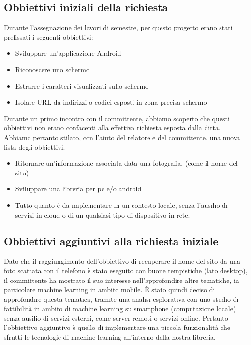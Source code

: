 \documentclass[twoside]{supsistudent}
\newcommand{\Decaa}{\newline\vspace{0.5mm}\newline\noindent}
\begin{document}
\subsection{Obbiettivi iniziali della richiesta}
Durante l’assegnazione dei lavori di semestre, per questo progetto erano stati prefissati i seguenti obbiettivi:

\begin{itemize}
\item Sviluppare un'applicazione Android
\item Riconoscere uno schermo
\item Estrarre i caratteri visualizzati sullo schermo
\item Isolare URL da indirizzi o codici esposti in zona precisa schermo

\end{itemize}

Durante un primo incontro con il committente, abbiamo scoperto che questi obbiettivi non erano confacenti alla effettiva richiesta esposta dalla ditta. Abbiamo pertanto stilato, con l’aiuto del relatore e del committente, una nuova lista degli obbiettivi.

\begin{itemize}
\item Ritornare un'informazione associata data una fotografia, (come il nome del sito)
\item Sviluppare una libreria per pc e/o android
\item Tutto quanto è da implementare in un contesto locale, senza l'ausilio di servizi in cloud o di un qualsiasi tipo di dispositivo in rete.
\end{itemize}

\subsection{Obbiettivi aggiuntivi alla richiesta iniziale}
Dato che il raggiungimento dell'obbiettivo di recuperare il nome del sito da una foto scattata con il telefono è stato eseguito con buone tempistiche (lato desktop), il committente ha mostrato il suo interesse nell'approfondire altre tematiche, in particolare machine learning in ambito mobile.
\Decaa
È stato quindi deciso di approfondire questa tematica, tramite una analisi esplorativa con uno studio di fattibilità in ambito di machine learning su smartphone (computazione locale) senza ausilio di servizi esterni, come server remoti o servizi online. 
\Decaa
Pertanto l'obbiettivo aggiuntivo è quello di implementare una piccola funzionalità che sfrutti le tecnologie di machine learning all'interno della nostra libreria.
\end{document}
